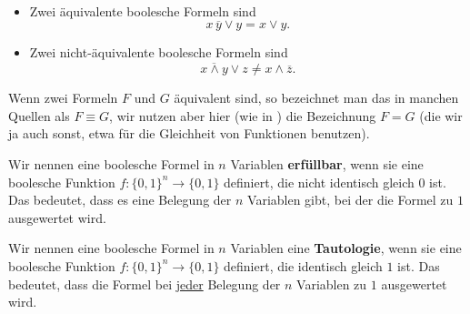 \begin{bsp}\,
\begin{itemize}
 \item Zwei äquivalente boolesche Formeln sind
	\[
		x \, \overline{y}\vee y= x \vee y.  
	\]

 \item Zwei nicht-äquivalente boolesche Formeln sind
	\[
		\overline{x \wedge y} \vee z \neq x \wedge \overline{z}.  
	\]
\end{itemize}
\end{bsp} 

\begin{bem}
	Wenn zwei Formeln $F$ und $G$ äquivalent sind, so bezeichnet man das in manchen Quellen als $F \equiv G$, wir nutzen aber hier (wie in \cite{Lov20}) die Bezeichnung $F = G$ (die wir ja auch sonst, etwa für die  Gleichheit von Funktionen benutzen). 
\end{bem} 

\begin{defn} 
Wir nennen eine boolesche Formel in $n$ Variablen \textbf{erfüllbar}, wenn sie eine boolesche Funktion $f : \{0,1\}^n \to \{0,1\}$ definiert, die nicht identisch gleich $0$ ist. Das bedeutet, dass es eine Belegung der $n$ Variablen gibt, bei der die Formel zu $1$ ausgewertet wird. 
\end{defn} 

\begin{defn} 
Wir nennen eine boolesche Formel in $n$ Variablen eine \textbf{Tautologie}, wenn sie eine boolesche Funktion $f: \{0,1\}^n \to \{0,1\}$ definiert, die identisch gleich $1$ ist. Das bedeutet, dass die Formel bei \underline{jeder} Belegung der $n$ Variablen zu $1$ ausgewertet wird. 
\end{defn} 


